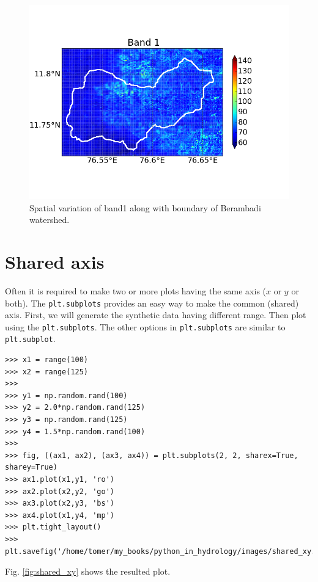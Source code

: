 \documentclass[10pt]{book}
\begin{document}
{\beforefig
\begin{figure}[h!]
  \centering
    \includegraphics[scale=0.5]{images/basemap.png}
  \caption{Spatial variation of band1 along with boundary of Berambadi watershed.}
   \label{fig:basemap}
\end{figure}
\afterfig


\section{Shared axis}
Often it is required to make two or more plots having the same axis ($x$ or $y$ or both). The \verb"plt.subplots" provides an easy way to make the common (shared) axis. First, we will generate the synthetic data having different range. Then plot using the \verb"plt.subplots". The other options in \verb"plt.subplots" are similar to \verb"plt.subplot". 
\beforeverb \begin{verbatim}
>>> x1 = range(100)
>>> x2 = range(125)
>>> 
>>> y1 = np.random.rand(100)
>>> y2 = 2.0*np.random.rand(125)
>>> y3 = np.random.rand(125)
>>> y4 = 1.5*np.random.rand(100)
>>> 
>>> fig, ((ax1, ax2), (ax3, ax4)) = plt.subplots(2, 2, sharex=True, sharey=True)
>>> ax1.plot(x1,y1, 'ro')
>>> ax2.plot(x2,y2, 'go')
>>> ax3.plot(x2,y3, 'bs')
>>> ax4.plot(x1,y4, 'mp')
>>> plt.tight_layout()
>>> plt.savefig('/home/tomer/my_books/python_in_hydrology/images/shared_xy.png')
\end{verbatim} \afterverb
Fig. \ref{fig:shared_xy} shows the resulted plot.

}
\end{document}
